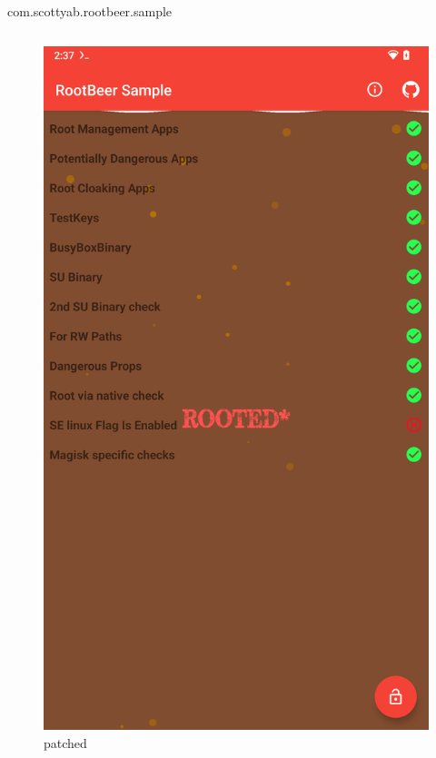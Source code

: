 \documentclass{beamer}
\begin{document}
\begin{frame}[fragile]{com.scottyab.rootbeer.sample}
\begin{columns}
\begin{figure}
            \centering
            \includegraphics[scale=0.07]{rootbeer-patched.png}
            \caption{patched}
            \end{figure}
    \end{columns}
\end{frame}
\end{document}
